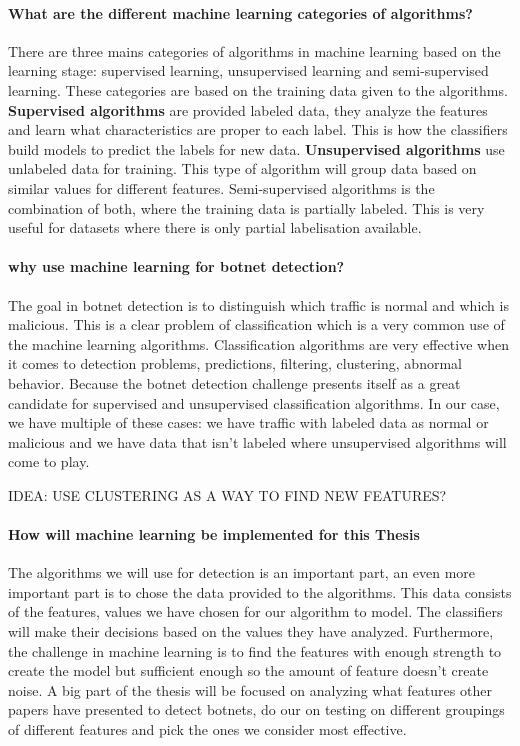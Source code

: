 \paragraph{What are the different machine learning categories of algorithms?}
There are three mains categories of algorithms in machine learning based on the learning stage: supervised learning, unsupervised learning and semi-supervised learning.
These categories are based on the training data given to the algorithms. \textbf{Supervised algorithms} are provided labeled data, they analyze the features and learn what characteristics are proper to each label. This is how the classifiers build models to predict the labels for new data.
\textbf{Unsupervised algorithms} use unlabeled data for training. This type of algorithm will group data based on similar values for different features.
Semi-supervised algorithms is the combination of both, where the training data is partially labeled. This is very useful for datasets where there is only partial labelisation available.

\paragraph{why use machine learning for botnet detection?}
The goal in botnet detection is to distinguish which traffic is normal and which is malicious. This is a clear problem of classification which is a very common use of the machine learning algorithms. Classification algorithms are very effective when it comes to detection problems, predictions, filtering, clustering, abnormal behavior.
Because the botnet detection challenge presents itself as a great candidate for supervised and unsupervised classification algorithms. In our case, we have multiple of these cases: we have traffic with labeled data as normal or malicious and we have data that isn't labeled where unsupervised algorithms will come to play.

IDEA: USE CLUSTERING AS A WAY TO FIND NEW FEATURES?

\paragraph{How will machine learning be implemented for this Thesis}
The algorithms we will use for detection is an important part, an even more important part is to chose the data provided to the algorithms. This data consists of the features, values we have chosen for our algorithm to model. The classifiers will make their decisions based on the values they have analyzed. Furthermore, the challenge in machine learning is to find the features with enough strength to create the model but sufficient enough so the amount of feature doesn't create noise. A big part of the thesis will be focused on analyzing what features other papers have presented to detect botnets, do our on testing on different groupings of different features and pick the ones we consider most effective. 

